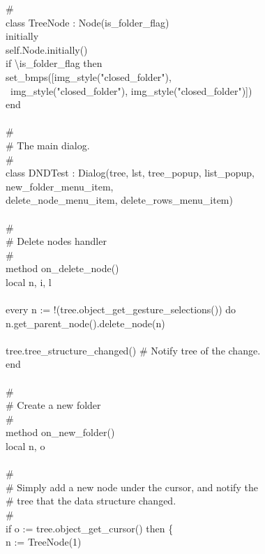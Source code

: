 {\# \\
class TreeNode : Node(is\_folder\_flag) \\
initially \\
\>self.Node.initially() \\
\>if {\textbackslash}is\_folder\_flag then \\
\>\>set\_bmps([img\_style("closed\_folder"), \\
\>\>\>\>\>\ img\_style("closed\_folder"), img\_style("closed\_folder")]) \\
end \\
\ \\
\# \\
\# The main dialog. \\
\# \\
class DNDTest : Dialog(tree, lst, tree\_popup, list\_popup, new\_folder\_menu\_item,  \\
\>\>\>\>\>\>\>delete\_node\_menu\_item, delete\_rows\_menu\_item) \\
\ \\
\>\# \\
\>\# Delete nodes handler \\
\>\# \\
\>method on\_delete\_node() \\
\>\>local n, i, l \\
\ \\
\>\>every n := !(tree.object\_get\_gesture\_selections()) do \\
\>\>\>n.get\_parent\_node().delete\_node(n) \\
\ \\
\>\>tree.tree\_structure\_changed() \# Notify tree of the change.\\
\>end \\
\ \\
\>\# \\
\>\# Create a new folder \\
\>\# \\
\>method on\_new\_folder() \\
\>\>local n, o \\
\ \\
\>\>\# \\
\>\>\# Simply add a new node under the cursor, and notify the \\
\>\>\# tree that the data structure changed. \\
\>\>\# \\
\>\>if o := tree.object\_get\_cursor() then \{ \\
\>\>\>n := TreeNode(1) \\
}
